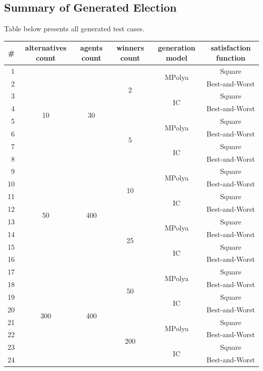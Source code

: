 \subsection{Summary of Generated Election}

Table below presents all generated test cases.

\begin{tabular}{r | c | c | c | c | c |}
	\# & alternatives count & agents count & winners count & generation model & satisfaction function \\
	\hline
	1 & \multirow{8}{*}{10} & \multirow{8}{*}{30} & \multirow{4}{*}{2} & \multirow{2}{*}{MPolya} & Square \\
	2 & & & & & Best-and-Worst \\
	\cline{5-6}
	3 & & & & \multirow{2}{*}{IC} & Square \\
	4 & & & & & Best-and-Worst \\
	\cline{4-6}
	5 & & & \multirow{4}{*}{5} & \multirow{2}{*}{MPolya} & Square \\
	6 & & & & & Best-and-Worst \\
	\cline{5-6}
	7 & & & & \multirow{2}{*}{IC} & Square \\
	8 & & & & & Best-and-Worst \\
	\hline
	9 & \multirow{8}{*}{50} & \multirow{8}{*}{400} & \multirow{4}{*}{10} & \multirow{2}{*}{MPolya} & Square \\
	10 & & & & & Best-and-Worst \\
	\cline{5-6}
	11 & & & & \multirow{2}{*}{IC} & Square \\
	12 & & & & & Best-and-Worst \\
	\cline{4-6}
	13 & & & \multirow{4}{*}{25} & \multirow{2}{*}{MPolya} & Square \\
	14 & & & & & Best-and-Worst \\
	\cline{5-6}
	15 & & & & \multirow{2}{*}{IC} & Square \\
	16 & & & & & Best-and-Worst \\
	\hline
	17 & \multirow{8}{*}{300} & \multirow{8}{*}{400} & \multirow{4}{*}{50} & \multirow{2}{*}{MPolya} & Square \\
	18 & & & & & Best-and-Worst \\
	\cline{5-6}
	19 & & & & \multirow{2}{*}{IC} & Square \\
	20 & & & & & Best-and-Worst \\
	\cline{4-6}
	21 & & & \multirow{4}{*}{200} & \multirow{2}{*}{MPolya} & Square \\
	22 & & & & & Best-and-Worst \\
	\cline{5-6}
	23 & & & & \multirow{2}{*}{IC} & Square \\
	24 & & & & & Best-and-Worst \\
	\hline
\end{tabular}
\\

